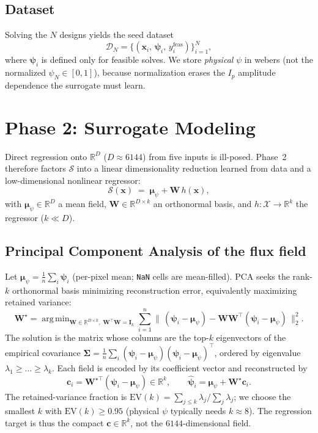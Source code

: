 \documentclass[11pt]{article}
\newcommand{\R}{\mathbb{R}}
\newcommand{\x}{\bm{x}}
\newcommand{\X}{\mathcal{X}}
\newcommand{\psiv}{\bm{\psi}}
\newcommand{\cvec}{\bm{c}}
\newcommand{\Wmat}{\bm{W}}
\newcommand{\Imat}{\bm{I}}
\DeclareMathOperator*{\argmin}{arg\,min}
\begin{document}
\subsection{Dataset}
Solving the $N$ designs yields the seed dataset
\begin{equation}
  \mathcal{D}_N = \big\{(\x_i,\,\psiv_i,\,y^{\mathrm{feas}}_i)\big\}_{i=1}^{N},
\end{equation}
where $\psiv_i$ is defined only for feasible solves. We store \emph{physical}
$\psi$ in webers (not the normalized $\psi_N\in[0,1]$), because normalization
erases the $I_p$ amplitude dependence the surrogate must learn.

\section{Phase 2: Surrogate Modeling}
\label{sec:phase2}

Direct regression onto $\R^{D}$ ($D\approx 6144$) from five inputs is
ill-posed. Phase~2 therefore factors $\mathcal{S}$ into a linear
dimensionality reduction learned from data and a low-dimensional nonlinear
regressor:
\begin{equation}
  \mathcal{S}(\x) \;=\; \bm{\mu}_\psi + \Wmat\, h(\x),
  \label{eq:surrogate-factor}
\end{equation}
with $\bm{\mu}_\psi\in\R^D$ a mean field, $\Wmat\in\R^{D\times k}$ an
orthonormal basis, and $h:\X\to\R^k$ the regressor ($k\ll D$).

\subsection{Principal Component Analysis of the flux field}

Let $\bm{\mu}_\psi = \frac1n\sum_i \psiv_i$ (per-pixel mean; \texttt{NaN} cells
are mean-filled). PCA seeks the rank-$k$ orthonormal basis minimizing
reconstruction error, equivalently maximizing retained variance:
\begin{equation}
  \Wmat^\star
  = \argmin_{\Wmat\in\R^{D\times k},\;\Wmat^\top\Wmat=\Imat_k}
  \sum_{i=1}^{n} \big\|\,(\psiv_i-\bm{\mu}_\psi)
  - \Wmat\Wmat^\top(\psiv_i-\bm{\mu}_\psi)\,\big\|_2^2 .
  \label{eq:pca}
\end{equation}
The solution is the matrix whose columns are the top-$k$ eigenvectors of the
empirical covariance
$\bm{\Sigma}=\frac1n\sum_i(\psiv_i-\bm{\mu}_\psi)(\psiv_i-\bm{\mu}_\psi)^\top$,
ordered by eigenvalue $\lambda_1\ge\dots\ge\lambda_k$. Each field is encoded by
its coefficient vector and reconstructed by
\begin{equation}
  \cvec_i = \Wmat^{\star\top}(\psiv_i-\bm{\mu}_\psi)\in\R^k,
  \qquad
  \hat{\psiv}_i = \bm{\mu}_\psi + \Wmat^\star \cvec_i .
\end{equation}
The retained-variance fraction is
$\mathrm{EV}(k)=\sum_{j\le k}\lambda_j / \sum_{j}\lambda_j$; we choose the
smallest $k$ with $\mathrm{EV}(k)\ge 0.95$ (physical $\psi$ typically needs
$k\approx 8$). The regression target is thus the compact $\cvec\in\R^k$, not
the $6144$-dimensional field.
\end{document}
